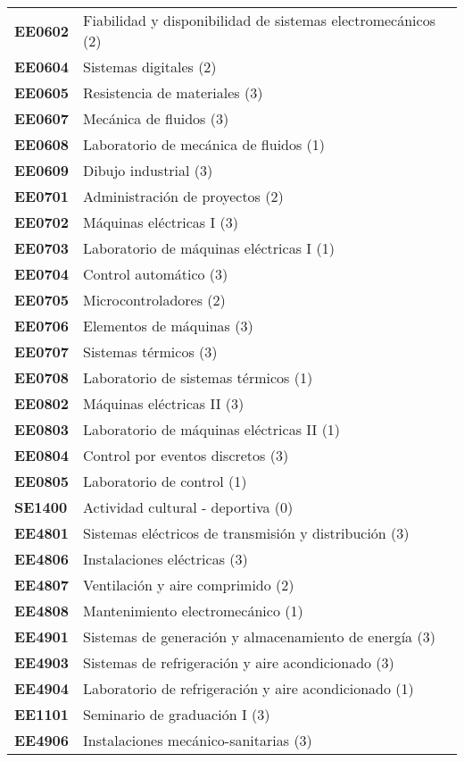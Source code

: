 \documentclass[letterpaper]{article}%
\begin{document}
\begin{tabularx}{\textwidth}{p{1.5cm}p{10cm}}
\textbf{EE0602}&Fiabilidad y disponibilidad de sistemas electromecánicos (2)\\%
\textbf{EE0604}&Sistemas digitales (2)\\%
\textbf{EE0605}&Resistencia de materiales (3)\\%
\textbf{EE0607}&Mecánica de fluidos (3)\\%
\textbf{EE0608}&Laboratorio de mecánica de fluidos (1)\\%
\textbf{EE0609}&Dibujo industrial (3)\\%
\textbf{EE0701}&Administración de proyectos (2)\\%
\textbf{EE0702}&Máquinas eléctricas I (3)\\%
\textbf{EE0703}&Laboratorio de máquinas eléctricas I (1)\\%
\textbf{EE0704}&Control automático (3)\\%
\textbf{EE0705}&Microcontroladores (2)\\%
\textbf{EE0706}&Elementos de máquinas (3)\\%
\textbf{EE0707}&Sistemas térmicos (3)\\%
\textbf{EE0708}&Laboratorio de sistemas térmicos (1)\\%
\textbf{EE0802}&Máquinas eléctricas II (3)\\%
\textbf{EE0803}&Laboratorio de máquinas eléctricas II (1)\\%
\textbf{EE0804}&Control por eventos discretos (3)\\%
\textbf{EE0805}&Laboratorio de control (1)\\%
\textbf{SE1400}&Actividad cultural {-} deportiva (0)\\%
\textbf{EE4801}&Sistemas eléctricos de transmisión y distribución (3)\\%
\textbf{EE4806}&Instalaciones eléctricas (3)\\%
\textbf{EE4807}&Ventilación y aire comprimido (2)\\%
\textbf{EE4808}&Mantenimiento electromecánico (1)\\%
\textbf{EE4901}&Sistemas de generación y almacenamiento de energía (3)\\%
\textbf{EE4903}&Sistemas de refrigeración y aire acondicionado (3)\\%
\textbf{EE4904}&Laboratorio de refrigeración y aire acondicionado (1)\\%
\textbf{EE1101}&Seminario de graduación I (3)\\%
\textbf{EE4906}&Instalaciones mecánico{-}sanitarias (3)\\%

\end{tabularx}
\end{document}
